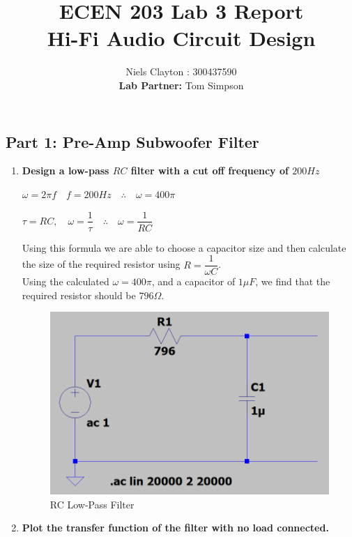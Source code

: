 \documentclass[a4paper,11pt]{article}
\begin{document}
	\title{\LARGE{\textbf{ECEN 203 Lab 3 Report}\\Hi-Fi Audio Circuit Design}}
	\author{Niels Clayton : 300437590\\ \textbf{Lab Partner: }Tom Simpson}
	\date{}
	\maketitle

	\begin{flushleft}
	\section*{Part 1: Pre-Amp Subwoofer Filter}
		\begin{enumerate}
		
		\item %
			\textbf{Design a low-pass $RC$ filter with a cut off frequency of $200Hz$}
		
			$\omega = 2 \pi f \quad
			f = 200Hz \quad 
			\therefore \quad \omega=400\pi$
		
			$\tau = RC, \quad 
			\omega = \dfrac{1}{\tau}\quad
			\therefore \quad \omega = \dfrac{1}{RC}$ 
			
			Using this formula we are able to choose a capacitor size and then calculate the size of the 			required resistor using $R = \dfrac{1}{\omega C}$.\\ 
			Using the calculated $\omega=400\pi$, and a capacitor of $1\mu F$, we find that the required 			resistor should be $796 \Omega$.
			
			\begin{figure}[ht]
				\centering
				\includegraphics[width=0.8\linewidth]{RC_Filter}
				\caption{RC Low-Pass Filter}
			\end{figure}
		
		\newpage
		\item %
			\textbf{Plot the transfer function of the filter with no load connected.}
			

\end{enumerate}
\end{flushleft}
\end{document}
